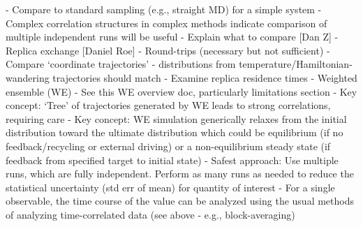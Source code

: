 - Compare to standard sampling (e.g., straight MD) for a simple system
- Complex correlation structures in complex methods indicate comparison of multiple independent runs will be useful
    - Explain what to compare [Dan Z]
- Replica exchange [Daniel Roe]
    - Round-trips (necessary but not sufficient)
    - Compare ‘coordinate trajectories’ - distributions from temperature/Hamiltonian-wandering trajectories should match
    - Examine replica residence times
- Weighted ensemble (WE)
    - See this WE overview doc, particularly limitations section
    - Key concept: ‘Tree’ of trajectories generated by WE leads to strong correlations, requiring care
    - Key concept: WE simulation generically relaxes from the initial distribution toward the ultimate distribution which could be equilibrium (if no feedback/recycling or external driving) or a non-equilibrium steady state (if feedback from specified target to initial state)
    - Safest approach: Use multiple runs, which are fully independent.  Perform as many runs as needed to reduce the statistical uncertainty (std err of mean) for quantity of interest
    - For a single observable, the time course of the value can be analyzed using the usual methods of analyzing time-correlated data (see above - e.g., block-averaging)


